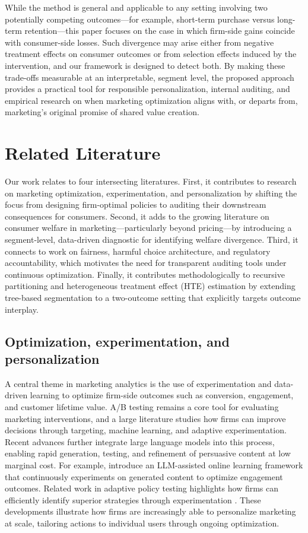 \documentclass[11pt,letterpaper,english]{article}
\theoremstyle{definition}
\theoremstyle{definition}
\begin{document}
\begin{bibunit}
While the method is general and applicable to any setting involving two potentially competing outcomes—for example, short-term purchase versus long-term retention—this paper focuses on the case in which firm-side gains coincide with consumer-side losses. Such divergence may arise either from negative treatment effects on consumer outcomes or from selection effects induced by the intervention, and our framework is designed to detect both. By making these trade-offs measurable at an interpretable, segment level, the proposed approach provides a practical tool for responsible personalization, internal auditing, and empirical research on when marketing optimization aligns with, or departs from, marketing’s original promise of shared value creation.

\section{Related Literature}
\label{sec:related_lit}

Our work relates to four intersecting literatures. First, it contributes to research on marketing optimization, experimentation, and personalization by shifting the focus from designing firm-optimal policies to auditing their downstream consequences for consumers. Second, it adds to the growing literature on consumer welfare in marketing—particularly beyond pricing—by introducing a segment-level, data-driven diagnostic for identifying welfare divergence. Third, it connects to work on fairness, harmful choice architecture, and regulatory accountability, which motivates the need for transparent auditing tools under continuous optimization. Finally, it contributes methodologically to recursive partitioning and heterogeneous treatment effect (HTE) estimation by extending tree-based segmentation to a two-outcome setting that explicitly targets outcome interplay.

\subsection{Optimization, experimentation, and personalization}
A central theme in marketing analytics is the use of experimentation and data-driven learning to optimize firm-side outcomes such as conversion, engagement, and customer lifetime value. A/B testing remains a core tool for evaluating marketing interventions, and a large literature studies how firms can improve decisions through targeting, machine learning, and adaptive experimentation. Recent advances further integrate large language models into this process, enabling rapid generation, testing, and refinement of persuasive content at low marginal cost. For example, \citet{ye2025lola} introduce an LLM-assisted online learning framework that continuously experiments on generated content to optimize engagement outcomes. Related work in adaptive policy testing highlights how firms can efficiently identify superior strategies through experimentation \citep{simester2020targeting}. These developments illustrate how firms are increasingly able to personalize marketing at scale, tailoring actions to individual users through ongoing optimization.


\end{bibunit}
\end{document}
